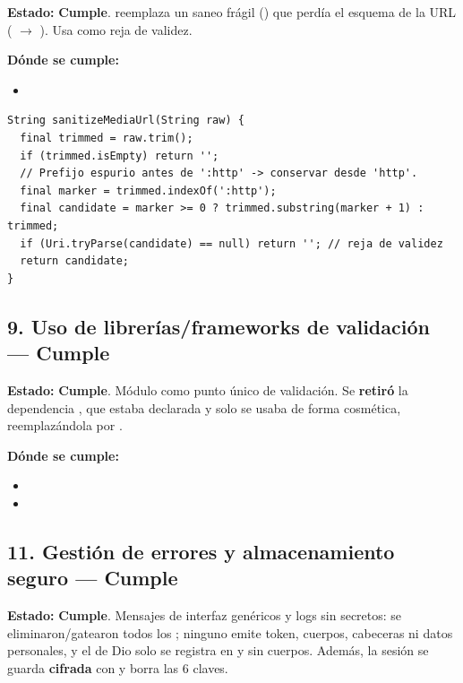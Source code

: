 \documentclass[11pt,a4paper]{article}
\newcommand{\Cumple}{\textcolor{cumpleColor}{\textbf{Cumple}}}
\begin{document}
\textbf{Estado:} \Cumple. \texttt{} reemplaza un saneo frágil (\texttt{}) que perdía el esquema de la URL (\texttt{} $\to$ \texttt{}). Usa \texttt{} como reja de validez.

\textbf{Dónde se cumple:}
\begin{itemize}[leftmargin=1.2cm,nosep]
\item \texttt{}
\end{itemize}

\begin{lstlisting}[style=dartstyle,caption={Canonicalización de URLs de medios (media\_url.dart)}]
String sanitizeMediaUrl(String raw) {
  final trimmed = raw.trim();
  if (trimmed.isEmpty) return '';
  // Prefijo espurio antes de ':http' -> conservar desde 'http'.
  final marker = trimmed.indexOf(':http');
  final candidate = marker >= 0 ? trimmed.substring(marker + 1) : trimmed;
  if (Uri.tryParse(candidate) == null) return ''; // reja de validez
  return candidate;
}
\end{lstlisting}

\subsection{9. Uso de librerías/frameworks de validación --- \Cumple}

\textbf{Estado:} \Cumple. Módulo \texttt{} como punto único de validación. Se \textbf{retiró} la dependencia \texttt{}, que estaba declarada y solo se usaba de forma cosmética, reemplazándola por \texttt{}.

\textbf{Dónde se cumple:}
\begin{itemize}[leftmargin=1.2cm,nosep]
\item \texttt{}
\item \texttt{}
\end{itemize}

\subsection{11. Gestión de errores y almacenamiento seguro --- \Cumple}

\textbf{Estado:} \Cumple. Mensajes de interfaz genéricos y logs sin secretos: se eliminaron/gatearon todos los \texttt{}; ninguno emite token, cuerpos, cabeceras ni datos personales, y el \texttt{} de Dio solo se registra en \texttt{} y sin cuerpos. Además, la sesión se guarda \textbf{cifrada} con \texttt{} y \texttt{} borra las 6 claves.
\end{document}
